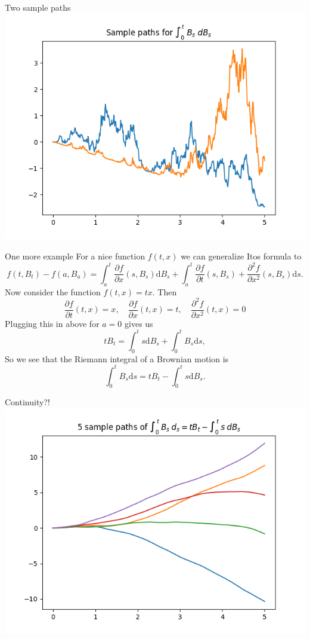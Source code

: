 \documentclass{beamer}%
\numberwithin{equation}{section}
\newcommand{\ud}{\ensuremath{\mathrm{d} }}
\begin{document}
\begin{frame}{Two sample paths}
	\includegraphics[scale=.7]{StochIntegralExample}
\end{frame}

\begin{frame}[t]{One more example}
	For a nice function $f(t,x)$ we can generalize Itos formula to 
	\[
	f(t,B_t) - f(a, B_a) = \int_a^t \frac{\partial f}{\partial x}(s, B_s) \ud B_s + \int_a^t \frac{\partial f}{\partial t}(s, B_s) + \frac{\partial^2 f}{\partial x^2}(s, B_s) \ud s.
	\]
	Now consider the function $f(t,x) = tx$. Then 
	\[
	\frac{\partial f}{\partial t}(t,x) = x, \quad \frac{\partial f}{\partial x}(t,x) = t, \quad \frac{\partial^2 f}{\partial x^2}(t,x) =0
	\]
	Plugging this in above for $a=0$ gives us
	\[
	tB_t = \int_0^t s \ud B_s + \int_0^t B_s \ud s,
	\]
	So we see that the Riemann integral of a Brownian motion is 
	\[
	\int_0^t B_s \ud s = t B_t -  \int_0^t s \ud B_s.
	\]
\end{frame}

\begin{frame}[t]{Continuity?!}
	\centering
	\includegraphics[scale=.6]{riemannBM.png}
\end{frame}
\end{document}
